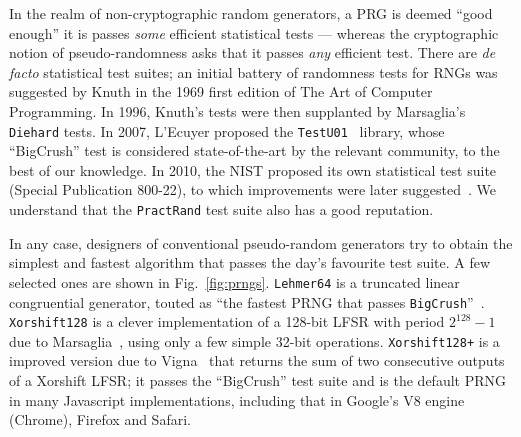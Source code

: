 \documentclass[submission,svgnames,journal=tosc]{iacrtrans}
\begin{document}
In the realm of non-cryptographic random generators, a PRG is deemed ``good
enough'' it is passes \emph{some} efficient statistical tests --- whereas the
cryptographic notion of pseudo-randomness asks that it passes \emph{any}
efficient test. There are \textit{de facto} statistical test suites; an initial
battery of randomness tests for RNGs was suggested by Knuth in the 1969 first
edition of The Art of Computer Programming. In 1996, Knuth's tests were then
supplanted by Marsaglia's \texttt{Diehard} tests. In 2007, L'Ecuyer proposed
the \texttt{TestU01}~\cite{LEcuyerS07} library, whose ``BigCrush'' test is
considered state-of-the-art by the relevant community, to the best of our
knowledge. In 2010, the NIST proposed its own statistical test suite (Special
Publication 800-22), to which improvements were later
suggested~\cite{ZhuMLZJ16}. We understand that the \texttt{PractRand} test suite
also has a good reputation.

In any case, designers of conventional pseudo-random generators try to obtain
the simplest and fastest algorithm that passes the day's favourite test suite. A
few selected ones are shown in Fig.~\ref{fig:prngs}. \texttt{Lehmer64} is a
truncated linear congruential generator, touted as ``the fastest PRNG that
passes \texttt{BigCrush}''~\cite{LemireLehmer}. \texttt{Xorshift128} is a clever
implementation of a 128-bit LFSR with period $2^{128} - 1$ due to
Marsaglia~\cite{Marsaglia03}, using only a few simple 32-bit
operations. \texttt{Xorshift128+} is a improved version due to
Vigna~\cite{Vigna17} that returns the sum of two consecutive outputs of a
Xorshift LFSR; it passes the ``BigCrush'' test suite and is the default PRNG in
many Javascript implementations, including that in Google's V8 engine (Chrome),
Firefox and Safari.
\end{document}
